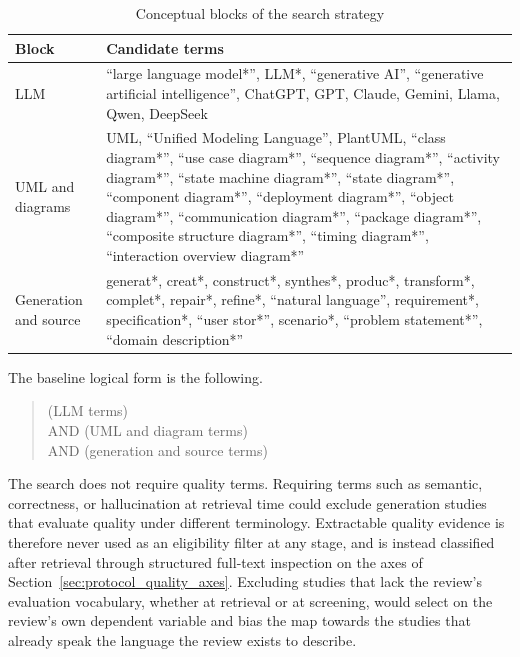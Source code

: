 \begin{table}[htbp]
\centering
\small
\caption{Conceptual blocks of the search strategy}
\label{tab:protocol_search_blocks}
\begin{tabularx}{\textwidth}{p{} X}
\toprule
\textbf{Block} & \textbf{Candidate terms} \\
\midrule
LLM & ``large language model*'', LLM*, ``generative AI'', ``generative artificial intelligence'', ChatGPT, GPT, Claude, Gemini, Llama, Qwen, DeepSeek \\
UML and diagrams & UML, ``Unified Modeling Language'', PlantUML, ``class diagram*'', ``use case diagram*'', ``sequence diagram*'', ``activity diagram*'', ``state machine diagram*'', ``state diagram*'', ``component diagram*'', ``deployment diagram*'', ``object diagram*'', ``communication diagram*'', ``package diagram*'', ``composite structure diagram*'', ``timing diagram*'', ``interaction overview diagram*'' \\
Generation and source & generat*, creat*, construct*, synthes*, produc*, transform*, complet*, repair*, refine*, ``natural language'', requirement*, specification*, ``user stor*'', scenario*, ``problem statement*'', ``domain description*'' \\
\bottomrule
\end{tabularx}
\end{table}

The baseline logical form is the following.

\begin{quote}
\begin{minipage}{0.92\textwidth}
\small\ttfamily\raggedright
(LLM terms)\\
AND (UML and diagram terms)\\
AND (generation and source terms)
\end{minipage}
\end{quote}

The search does not require quality terms. Requiring terms such as semantic, correctness, or hallucination at retrieval time could exclude generation studies that evaluate quality under different terminology. Extractable quality evidence is therefore never used as an eligibility filter at any stage, and is instead classified after retrieval through structured full-text inspection on the axes of Section~\ref{sec:protocol_quality_axes}. Excluding studies that lack the review's evaluation vocabulary, whether at retrieval or at screening, would select on the review's own dependent variable and bias the map towards the studies that already speak the language the review exists to describe.

